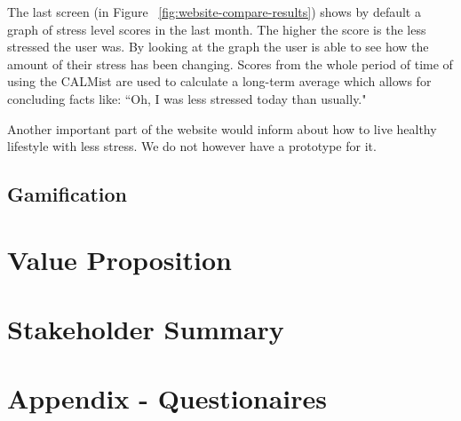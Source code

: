 \documentclass{scrartcl}
\begin{document}
The last screen (in Figure ~\ref{fig:website-compare-results}) shows by default a graph of stress level scores in the last month. The higher the score is the less stressed the user was. By looking at the graph the user is able to see how the amount of their stress has been changing. Scores from the whole period of time of using the CALMist are used to calculate a long-term average which allows for concluding facts like: ``Oh, I was less stressed today than usually."

Another important part of the website would inform about how to live healthy lifestyle with less stress. We do not however have a prototype for it.

\subsection{Gamification}

\section{Value Proposition}

\section{Stakeholder Summary}

\section{Appendix - Questionaires}
\end{document}
